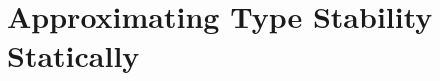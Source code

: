 \chapter{Approximating Type Stability Statically}\label{chap:approx}

\lstset{language=julia}







%






